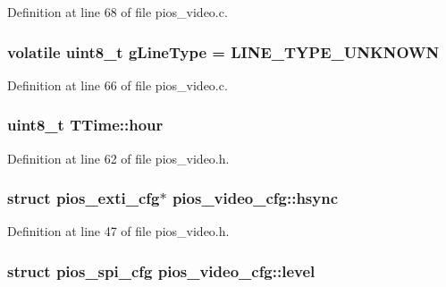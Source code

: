\-Definition at line 68 of file pios\-\_\-video.\-c.

\hypertarget{group___p_i_o_s___v_i_d_e_o_ga2be6bb035ef820488def868f5165b836}{
\subsubsection[{g\-Line\-Type}]{\setlength{\rightskip}{0pt plus 5cm}volatile uint8\-\_\-t {\bf g\-Line\-Type} = \-L\-I\-N\-E\-\_\-\-T\-Y\-P\-E\-\_\-\-U\-N\-K\-N\-O\-W\-N}}\label{group___p_i_o_s___v_i_d_e_o_ga2be6bb035ef820488def868f5165b836}


\-Definition at line 66 of file pios\-\_\-video.\-c.

\hypertarget{group___p_i_o_s___v_i_d_e_o_gae7afd210e593b007611ac237bd32d30d}{
\subsubsection[{hour}]{\setlength{\rightskip}{0pt plus 5cm}uint8\-\_\-t {\bf \-T\-Time\-::hour}}}\label{group___p_i_o_s___v_i_d_e_o_gae7afd210e593b007611ac237bd32d30d}


\-Definition at line 62 of file pios\-\_\-video.\-h.

\hypertarget{group___p_i_o_s___v_i_d_e_o_ga01589e94ad18d5c8d12f72778539f8aa}{
\subsubsection[{hsync}]{\setlength{\rightskip}{0pt plus 5cm}struct {\bf pios\-\_\-exti\-\_\-cfg}$\ast$ {\bf pios\-\_\-video\-\_\-cfg\-::hsync}}}\label{group___p_i_o_s___v_i_d_e_o_ga01589e94ad18d5c8d12f72778539f8aa}


\-Definition at line 47 of file pios\-\_\-video.\-h.

\hypertarget{group___p_i_o_s___v_i_d_e_o_gab3de6ddfa1d478f8062c895cad5d4793}{
\subsubsection[{level}]{\setlength{\rightskip}{0pt plus 5cm}struct {\bf pios\-\_\-spi\-\_\-cfg} {\bf pios\-\_\-video\-\_\-cfg\-::level}}}\label{group___p_i_o_s___v_i_d_e_o_gab3de6ddfa1d478f8062c895cad5d4793}


